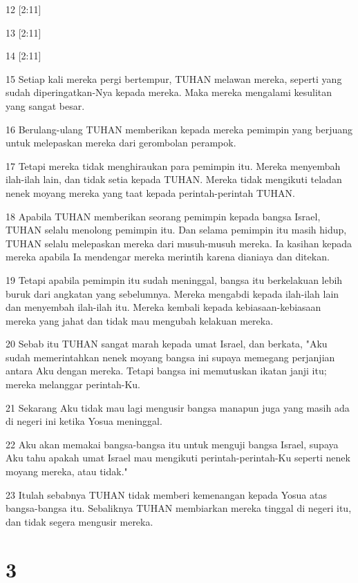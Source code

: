 \par 12 [2:11]
\par 13 [2:11]
\par 14 [2:11]
\par 15 Setiap kali mereka pergi bertempur, TUHAN melawan mereka, seperti yang sudah diperingatkan-Nya kepada mereka. Maka mereka mengalami kesulitan yang sangat besar.
\par 16 Berulang-ulang TUHAN memberikan kepada mereka pemimpin yang berjuang untuk melepaskan mereka dari gerombolan perampok.
\par 17 Tetapi mereka tidak menghiraukan para pemimpin itu. Mereka menyembah ilah-ilah lain, dan tidak setia kepada TUHAN. Mereka tidak mengikuti teladan nenek moyang mereka yang taat kepada perintah-perintah TUHAN.
\par 18 Apabila TUHAN memberikan seorang pemimpin kepada bangsa Israel, TUHAN selalu menolong pemimpin itu. Dan selama pemimpin itu masih hidup, TUHAN selalu melepaskan mereka dari musuh-musuh mereka. Ia kasihan kepada mereka apabila Ia mendengar mereka merintih karena dianiaya dan ditekan.
\par 19 Tetapi apabila pemimpin itu sudah meninggal, bangsa itu berkelakuan lebih buruk dari angkatan yang sebelumnya. Mereka mengabdi kepada ilah-ilah lain dan menyembah ilah-ilah itu. Mereka kembali kepada kebiasaan-kebiasaan mereka yang jahat dan tidak mau mengubah kelakuan mereka.
\par 20 Sebab itu TUHAN sangat marah kepada umat Israel, dan berkata, "Aku sudah memerintahkan nenek moyang bangsa ini supaya memegang perjanjian antara Aku dengan mereka. Tetapi bangsa ini memutuskan ikatan janji itu; mereka melanggar perintah-Ku.
\par 21 Sekarang Aku tidak mau lagi mengusir bangsa manapun juga yang masih ada di negeri ini ketika Yosua meninggal.
\par 22 Aku akan memakai bangsa-bangsa itu untuk menguji bangsa Israel, supaya Aku tahu apakah umat Israel mau mengikuti perintah-perintah-Ku seperti nenek moyang mereka, atau tidak."
\par 23 Itulah sebabnya TUHAN tidak memberi kemenangan kepada Yosua atas bangsa-bangsa itu. Sebaliknya TUHAN membiarkan mereka tinggal di negeri itu, dan tidak segera mengusir mereka.

\chapter{3}

